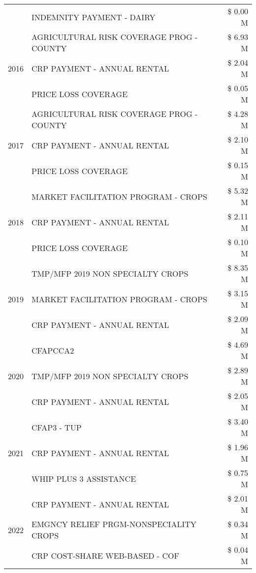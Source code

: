 \begin{tabular}{llr}
 & INDEMNITY PAYMENT - DAIRY & \$ 0.00 M \\
\cline{1-3}
\multirow[t]{3}{*}{2016} & AGRICULTURAL RISK COVERAGE PROG - COUNTY & \$ 6.93 M \\
 & CRP PAYMENT - ANNUAL RENTAL & \$ 2.04 M \\
 & PRICE LOSS COVERAGE & \$ 0.05 M \\
\cline{1-3}
\multirow[t]{3}{*}{2017} & AGRICULTURAL RISK COVERAGE PROG - COUNTY & \$ 4.28 M \\
 & CRP PAYMENT - ANNUAL RENTAL & \$ 2.10 M \\
 & PRICE LOSS COVERAGE & \$ 0.15 M \\
\cline{1-3}
\multirow[t]{3}{*}{2018} & MARKET FACILITATION PROGRAM - CROPS & \$ 5.32 M \\
 & CRP PAYMENT - ANNUAL RENTAL & \$ 2.11 M \\
 & PRICE LOSS COVERAGE & \$ 0.10 M \\
\cline{1-3}
\multirow[t]{3}{*}{2019} & TMP/MFP 2019 NON SPECIALTY CROPS & \$ 8.35 M \\
 & MARKET FACILITATION PROGRAM - CROPS & \$ 3.15 M \\
 & CRP PAYMENT - ANNUAL RENTAL & \$ 2.09 M \\
\cline{1-3}
\multirow[t]{3}{*}{2020} & CFAPCCA2 & \$ 4.69 M \\
 & TMP/MFP 2019 NON SPECIALTY CROPS & \$ 2.89 M \\
 & CRP PAYMENT - ANNUAL RENTAL & \$ 2.05 M \\
\cline{1-3}
\multirow[t]{3}{*}{2021} & CFAP3 - TUP & \$ 3.40 M \\
 & CRP PAYMENT - ANNUAL RENTAL & \$ 1.96 M \\
 & WHIP PLUS 3 ASSISTANCE & \$ 0.75 M \\
\cline{1-3}
\multirow[t]{3}{*}{2022} & CRP PAYMENT - ANNUAL RENTAL & \$ 2.01 M \\
 & EMGNCY RELIEF PRGM-NONSPECIALITY CROPS & \$ 0.34 M \\
 & CRP COST-SHARE WEB-BASED - COF & \$ 0.04 M \\
\cline{1-3}
\bottomrule
\end{tabular}
